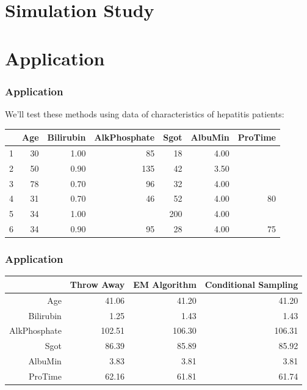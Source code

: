 \documentclass{beamer}
\begin{document}
\section{Simulation Study}


\section{Application}
\begin{frame}
\frametitle{Application}
We'll test these methods using data of characteristics of hepatitis patients:
\begin{table}[ht]
\centering
\begin{tabular}{rrrrrrr}
  \hline
 & Age & Bilirubin & AlkPhosphate & Sgot & AlbuMin & ProTime \\ 
  \hline
1 &  30 & 1.00 &  85 &  18 & 4.00 &  \\ 
  2 &  50 & 0.90 & 135 &  42 & 3.50 &  \\ 
  3 &  78 & 0.70 &  96 &  32 & 4.00 &  \\ 
  4 &  31 & 0.70 &  46 &  52 & 4.00 &  80 \\ 
  5 &  34 & 1.00 &  & 200 & 4.00 &  \\ 
  6 &  34 & 0.90 &  95 &  28 & 4.00 &  75 \\ 
   \hline
\end{tabular}
\end{table}
\end{frame}

\begin{frame}
\frametitle{Application}
\begin{table}[ht]
\centering
\begin{tabular}{rrrr}
  \hline
 & Throw Away & EM Algorithm & Conditional Sampling \\ 
  \hline
Age & 41.06 & 41.20 & 41.20 \\ 
  Bilirubin & 1.25 & 1.43 & 1.43 \\ 
  AlkPhosphate & 102.51 & 106.30 & 106.31 \\ 
  Sgot & 86.39 & 85.89 & 85.92 \\ 
  AlbuMin & 3.83 & 3.81 & 3.81 \\ 
  ProTime & 62.16 & 61.81 & 61.74 \\ 
   \hline
\end{tabular}
\end{table}

\end{frame}
\end{document}
